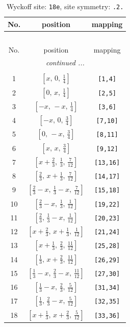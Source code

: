 \documentclass[fleqn,8pt]{jsarticle}
\begin{document}
\renewcommand{\arraystretch}{1.2}
\begin{longtable}{ccc}
\caption{Wyckoff site: {\tt 18e}, site symmetry: {\tt .2.}}
 \\
 \hline \hline
No. & position & mapping \\ \hline \endfirsthead

\multicolumn{2}{l}{\tablename\ \thetable{}} \\
 \hline \hline
No. & position & mapping \\ \hline \endhead

 \hline \hline
\multicolumn{2}{r}{\footnotesize\it continued ...} \\ \endfoot

 \hline \hline
\multicolumn{2}{r}{} \\ \endlastfoot

1 & $\left[ x,\, 0,\, \frac{1}{4} \right]$ & {\tt [1,4]} \\ \hline
2 & $\left[ 0,\, x,\, \frac{1}{4} \right]$ & {\tt [2,5]} \\ \hline
3 & $\left[ - x,\, - x,\, \frac{1}{4} \right]$ & {\tt [3,6]} \\ \hline
4 & $\left[ - x,\, 0,\, \frac{3}{4} \right]$ & {\tt [7,10]} \\ \hline
5 & $\left[ 0,\, - x,\, \frac{3}{4} \right]$ & {\tt [8,11]} \\ \hline
6 & $\left[ x,\, x,\, \frac{3}{4} \right]$ & {\tt [9,12]} \\ \hline
7 & $\left[ x + \frac{2}{3},\, \frac{1}{3},\, \frac{7}{12} \right]$ & {\tt [13,16]} \\ \hline
8 & $\left[ \frac{2}{3},\, x + \frac{1}{3},\, \frac{7}{12} \right]$ & {\tt [14,17]} \\ \hline
9 & $\left[ \frac{2}{3} - x,\, \frac{1}{3} - x,\, \frac{7}{12} \right]$ & {\tt [15,18]} \\ \hline
10 & $\left[ \frac{2}{3} - x,\, \frac{1}{3},\, \frac{1}{12} \right]$ & {\tt [19,22]} \\ \hline
11 & $\left[ \frac{2}{3},\, \frac{1}{3} - x,\, \frac{1}{12} \right]$ & {\tt [20,23]} \\ \hline
12 & $\left[ x + \frac{2}{3},\, x + \frac{1}{3},\, \frac{1}{12} \right]$ & {\tt [21,24]} \\ \hline
13 & $\left[ x + \frac{1}{3},\, \frac{2}{3},\, \frac{11}{12} \right]$ & {\tt [25,28]} \\ \hline
14 & $\left[ \frac{1}{3},\, x + \frac{2}{3},\, \frac{11}{12} \right]$ & {\tt [26,29]} \\ \hline
15 & $\left[ \frac{1}{3} - x,\, \frac{2}{3} - x,\, \frac{11}{12} \right]$ & {\tt [27,30]} \\ \hline
16 & $\left[ \frac{1}{3} - x,\, \frac{2}{3},\, \frac{5}{12} \right]$ & {\tt [31,34]} \\ \hline
17 & $\left[ \frac{1}{3},\, \frac{2}{3} - x,\, \frac{5}{12} \right]$ & {\tt [32,35]} \\ \hline
18 & $\left[ x + \frac{1}{3},\, x + \frac{2}{3},\, \frac{5}{12} \right]$ & {\tt [33,36]} \\
\end{longtable}
\end{document}
